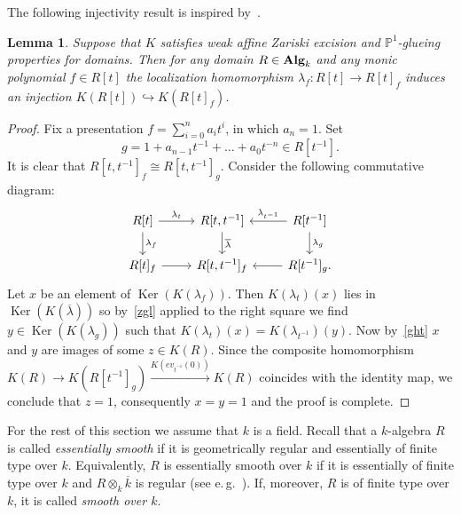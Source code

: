 \documentclass[oneside, 11pt]{amsart} \pdfoutput=1
\newcommand{\Ker}{\mathop{\mathrm{Ker}}\nolimits}
\numberwithin{equation}{section}
\newtheorem{lemma}{Lemma} \numberwithin{lemma}{section}
\theoremstyle{definition}
\newcommand{\catname}[1]{{\normalfont\textbf{#1}}} %
\begin{document}
The following injectivity result is inspired by~\cite[Corollary~5.2]{Tu83}.
\begin{lemma} \label{lmp}
Suppose that $K$ satisfies weak affine Zariski excision and $\mathbb{P}^1$-glueing properties for domains. Then for any domain $R\in \catname{Alg}_k$ and any monic polynomial $f\in R[t]$ the localization homomorphism $\lambda_f\colon R[t]\rightarrow R[t]_f$ induces an injection $K(R[t])\hookrightarrow K(R[t]_f).$ \end{lemma}
\begin{proof}
	Fix a presentation $f=\sum_{i=0}^n a_it^i$, in which $a_n=1$. Set $$g=1+a_{n-1}t^{-1}+\ldots+a_0t^{-n}\in R[t^{-1}].$$ It is clear that $R[t, t^{-1}]_f \cong R[t, t^{-1}]_g$. Consider the following commutative diagram:
$$\begin{tikzcd}
	R[t] \ar{r}{\lambda_t} \ar{d}{\lambda_f} & R[t, t^{-1}] \ar{d}{\overline{\lambda}} & R[t^{-1}] \ar{l}[']{\lambda_{t^{-1}}} \ar{d}{\lambda_g}\\
	R[t]_f \ar{r} & R[t, t^{-1}]_f & R[t^{-1}]_g. \ar{l}
\end{tikzcd}$$
Let $x$ be an element of $\Ker(K(\lambda_f))$. Then $K(\lambda_t)(x)$ lies in $\Ker(K(\overline{\lambda}))$ so by~\cref{zgl} applied to the right square we find $y \in \Ker(K(\lambda_{g}))$ such that $K(\lambda_t)(x) = K(\lambda_{t^{-1}})(y)$. Now by~\cref{ght} $x$ and $y$ are images of some $z \in K(R)$. 
Since the composite homomorphism $K(R) \to K(R[t^{-1}]_g) \xrightarrow{K(ev_{t^{-1}}(0))} K(R)$ coincides with the identity map, we conclude that $z=1$, consequently $x = y = 1$ and the proof is complete. \end{proof}

For the rest of this section we assume that $k$ is a field.
Recall that a $k$-algebra $R$ is called {\it essentially smooth} if it is geometrically regular and essentially of finite type over $k$. 
Equivalently, $R$ is essentially smooth over $k$ if it is essentially of finite type over $k$ and $R\otimes_k\overline k$ is regular (see e.\,g.~\cite[p.~137]{Sw98}). 
If, moreover, $R$ is of finite type over $k$, it is called {\it smooth over $k$}.
\end{document}
